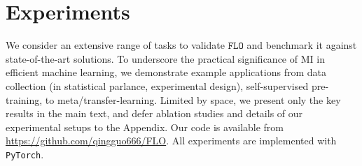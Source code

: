 \documentclass{article}
\theoremstyle{plain}
\theoremstyle{definition}
\theoremstyle{remark}
\newcommand{\infonce}{\texttt{InfoNCE}}
\newcommand{\FLO}{\texttt{FLO}}
\newcommand{\PMI}{\text{PMI}}
\begin{document}
		
		
		\vspace{-3pt}
		\section{Experiments}
		\vspace{-3pt}
		\label{sec:exp}
		
		We consider an extensive range of tasks to validate $\FLO$ and benchmark it against state-of-the-art solutions. To underscore the practical significance of MI in efficient machine learning, we demonstrate example applications from data collection (in statistical parlance, experimental design), self-supervised pre-training, to meta/transfer-learning. Limited by space, we present only the key results in the main text, and defer ablation studies and details of our experimental setups to the Appendix. Our code is available from \url{https://github.com/qingguo666/FLO}. All experiments are implemented with \texttt{PyTorch}.
		
		
		
		
		
		
		
\end{document}

